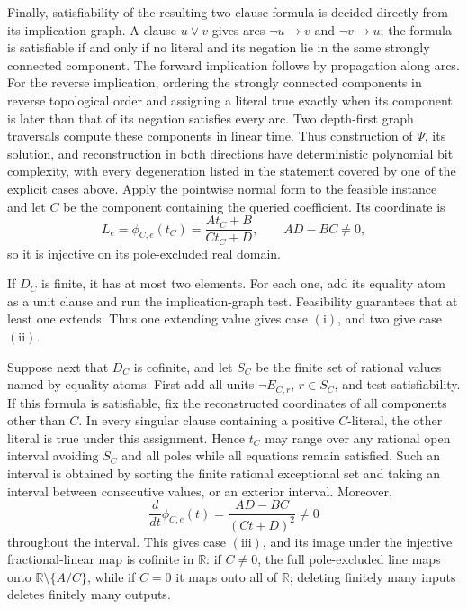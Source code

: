 Finally, satisfiability of the resulting two-clause formula is decided directly from its implication graph.  A clause \(u\lor v\) gives arcs \(\neg u\to v\) and \(\neg v\to u\); the formula is satisfiable if and only if no literal and its negation lie in the same strongly connected component.  The forward implication follows by propagation along arcs.  For the reverse implication, ordering the strongly connected components in reverse topological order and assigning a literal true exactly when its component is later than that of its negation satisfies every arc.  Two depth-first graph traversals compute these components in linear time.  Thus construction of \(\Psi\), its solution, and reconstruction in both directions have deterministic polynomial bit complexity, with every degeneration listed in the statement covered by one of the explicit cases above.
Apply the pointwise normal form to the feasible instance and let \(C\) be the component containing the queried coefficient.  Its coordinate is
\[
L_e=\phi_{C,e}(t_C)=\frac{A t_C+B}{C t_C+D},
\qquad AD-BC\ne0,
\]
so it is injective on its pole-excluded real domain.

If \(D_C\) is finite, it has at most two elements.  For each one, add its equality atom as a unit clause and run the implication-graph test.  Feasibility guarantees that at least one extends.  Thus one extending value gives case \(\mathrm{(i)}\), and two give case \(\mathrm{(ii)}\).

Suppose next that \(D_C\) is cofinite, and let \(S_C\) be the finite set of rational values named by equality atoms.  First add all units \(\neg E_{C,r}\), \(r\in S_C\), and test satisfiability.  If this formula is satisfiable, fix the reconstructed coordinates of all components other than \(C\).  In every singular clause containing a positive \(C\)-literal, the other literal is true under this assignment.  Hence \(t_C\) may range over any rational open interval avoiding \(S_C\) and all poles while all equations remain satisfied.  Such an interval is obtained by sorting the finite rational exceptional set and taking an interval between consecutive values, or an exterior interval.  Moreover,
\[
\frac{d}{dt}\phi_{C,e}(t)=\frac{AD-BC}{(Ct+D)^2}\ne0
\]
throughout the interval.  This gives case \(\mathrm{(iii)}\), and its image under the injective fractional-linear map is cofinite in \(\mathbb R\): if \(C\ne0\), the full pole-excluded line maps onto \(\mathbb R\setminus\{A/C\}\), while if \(C=0\) it maps onto all of \(\mathbb R\); deleting finitely many inputs deletes finitely many outputs.

